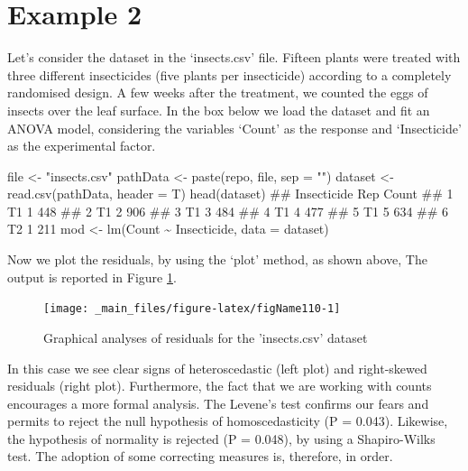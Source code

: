 \documentclass[a4paper,12pt,oneside]{book}
\newenvironment{Shaded}{\begin{snugshade}}{\end{snugshade}}
\newcommand{\SpecialCharTok}[1]{#1}
\newcommand{\StringTok}[1]{#1}
\newcommand{\DocumentationTok}[1]{#1}
\newcommand{\OtherTok}[1]{#1}
\newcommand{\FunctionTok}[1]{#1}
\newcommand{\AttributeTok}[1]{#1}
\newcommand{\NormalTok}[1]{#1}
\begin{document}
\hypertarget{example-2}{%
\section{Example 2}\label{example-2}}

Let's consider the dataset in the `insects.csv' file. Fifteen plants were treated with three different insecticides (five plants per insecticide) according to a completely randomised design. A few weeks after the treatment, we counted the eggs of insects over the leaf surface. In the box below we load the dataset and fit an ANOVA model, considering the variables `Count' as the response and `Insecticide' as the experimental factor.

\begin{Shaded}
\begin{Highlighting}[]
\NormalTok{file }\OtherTok{\textless{}{-}} \StringTok{"insects.csv"}
\NormalTok{pathData }\OtherTok{\textless{}{-}} \FunctionTok{paste}\NormalTok{(repo, file, }\AttributeTok{sep =} \StringTok{""}\NormalTok{)}
\NormalTok{dataset }\OtherTok{\textless{}{-}} \FunctionTok{read.csv}\NormalTok{(pathData, }\AttributeTok{header =}\NormalTok{ T)}
\FunctionTok{head}\NormalTok{(dataset)}
\DocumentationTok{\#\#   Insecticide Rep Count}
\DocumentationTok{\#\# 1          T1   1   448}
\DocumentationTok{\#\# 2          T1   2   906}
\DocumentationTok{\#\# 3          T1   3   484}
\DocumentationTok{\#\# 4          T1   4   477}
\DocumentationTok{\#\# 5          T1   5   634}
\DocumentationTok{\#\# 6          T2   1   211}
\NormalTok{mod }\OtherTok{\textless{}{-}} \FunctionTok{lm}\NormalTok{(Count }\SpecialCharTok{\textasciitilde{}}\NormalTok{ Insecticide, }\AttributeTok{data =}\NormalTok{ dataset)}
\end{Highlighting}
\end{Shaded}

Now we plot the residuals, by using the `plot' method, as shown above, The output is reported in Figure \ref{fig:figName110}.

\begin{figure}

{\centering \texttt{[image: \_main\_files/figure-latex/figName110-1]} 

}

\caption{Graphical analyses of residuals for the 'insects.csv' dataset}\label{fig:figName110}
\end{figure}

In this case we see clear signs of heteroscedastic (left plot) and right-skewed residuals (right plot). Furthermore, the fact that we are working with counts encourages a more formal analysis. The Levene's test confirms our fears and permits to reject the null hypothesis of homoscedasticity (P = 0.043). Likewise, the hypothesis of normality is rejected (P = 0.048), by using a Shapiro-Wilks test. The adoption of some correcting measures is, therefore, in order.
\end{document}

